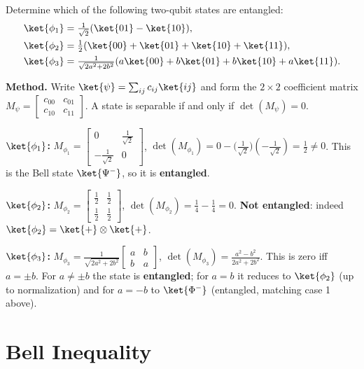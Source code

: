\documentclass[oneside]{academica}
\begin{document}
\begin{exercise*}
  Determine which of the following two-qubit states are entangled:
  \begin{align*}
    \ket{\phi_1} &= \tfrac{1}{\sqrt{2}}(\ket{01}-\ket{10}), \\
    \ket{\phi_2} &= \tfrac{1}{2}(\ket{00}+\ket{01}+\ket{10}+\ket{11}), \\
    \ket{\phi_3} &= \tfrac{1}{\sqrt{2a^2+2b^2}}(a\ket{00}+b\ket{01}+b\ket{10}+a\ket{11}).
  \end{align*}

  \textbf{Method.}  Write $\ket{\psi}=\sum_{ij}c_{ij}\ket{ij}$ and form the $2\times2$ coefficient matrix $M_\psi=\begin{bmatrix}c_{00}&c_{01}\\c_{10}&c_{11}\end{bmatrix}$. A state is separable if and only if $\det(M_\psi)=0$.

  \textbf{$\ket{\phi_1}$:}
  $M_{\phi_1}=\begin{bmatrix}0&\frac{1}{\sqrt{2}}\\-\frac{1}{\sqrt{2}}&0\end{bmatrix}$,
  $\det(M_{\phi_1})=0-\bigl(\tfrac{1}{\sqrt{2}}\bigr)(-\tfrac{1}{\sqrt{2}})=\tfrac{1}{2}\neq0$.
  This is the Bell state $\ket{\Psi^-}$, so it is \textbf{entangled}.

  \textbf{$\ket{\phi_2}$:}
  $M_{\phi_2}=\begin{bmatrix}\frac{1}{2}&\frac{1}{2}\\\frac{1}{2}&\frac{1}{2}\end{bmatrix}$,
  $\det(M_{\phi_2})=\tfrac{1}{4}-\tfrac{1}{4}=0$.
  \textbf{Not entangled}: indeed $\ket{\phi_2}=\ket{+}\otimes\ket{+}$.

  \textbf{$\ket{\phi_3}$:}
  $M_{\phi_3}=\frac{1}{\sqrt{2a^2+2b^2}}\begin{bmatrix}a&b\\b&a\end{bmatrix}$,
  $\det(M_{\phi_3})=\frac{a^2-b^2}{2a^2+2b^2}$.
  This is zero iff $a=\pm b$.
  For $a\neq\pm b$ the state is \textbf{entangled}; for $a=b$ it reduces to $\ket{\phi_2}$ (up to normalization) and for $a=-b$ to $\ket{\Phi^-}$ (entangled, matching case 1 above).
\end{exercise*}

\section{Bell Inequality}
\end{document}

